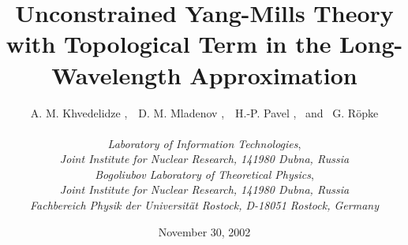 \documentclass[a4paper,12pt]{article}
\begin{document}
\title{\bf
Unconstrained \coordHE{} Yang-Mills Theory with Topological Term
in the Long-Wavelength Approximation}

\author{
A. M. Khvedelidze \coordHE{},  \,\,
D. M. Mladenov    \coordHE{},      \,\,
H.-P. Pavel       \coordHE{},      \, and  \,
G. R\"opke        \coordHE{} \\[4mm]
\\[2mm]
\coordHE{} {\it Laboratory of Information Technologies},\\
{\it Joint Institute for Nuclear Research, 141980 Dubna, Russia}\\[2mm]
\coordHE{} {\it Bogoliubov Laboratory of Theoretical Physics},\\
{\it Joint Institute for Nuclear Research, 141980 Dubna, Russia}\\[2mm]
\coordHE{} {\it Fachbereich Physik der Universit\"at Rostock, D-18051 Rostock, Germany}}

\date{November 30, 2002}
\maketitle
\end{document}
